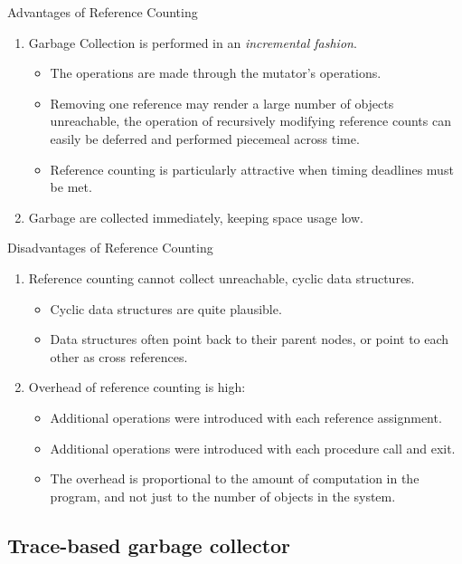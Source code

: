\begin{bibunit}[apalike]
\begin{frame}{Advantages of Reference Counting}
	\begin{enumerate}
	\item Garbage Collection is performed in an \emph{incremental fashion}.
		\begin{itemize}
		\item The operations are made through the mutator's operations.
		\item Removing one reference may render a large number of objects unreachable, the operation of recursively modifying reference counts can easily be deferred and performed piecemeal across time.
		\item Reference counting is particularly attractive when timing deadlines must be met.
		\end{itemize}
	\vfill
	\item Garbage are collected immediately, keeping space usage low.
	\end{enumerate}
\end{frame}

\begin{frame}{Disadvantages of Reference Counting}
	\begin{enumerate}
	\item Reference counting cannot collect unreachable, cyclic data structures.
		\begin{itemize}
		\item Cyclic data structures are quite plausible.
		\item Data structures often point back to their parent nodes, or point to each other as cross references.
		\end{itemize}
	\vfill
	\item Overhead of reference counting is high:
		\begin{itemize}
		\item Additional operations were introduced with each reference assignment.
		\item Additional operations were introduced with each procedure call and exit.
		\item The overhead is proportional to the amount of computation in the program, and not just to the number of objects in the system.
		\end{itemize}
	\end{enumerate}
\end{frame}

\subsection{Trace-based garbage collector}


\end{bibunit}
